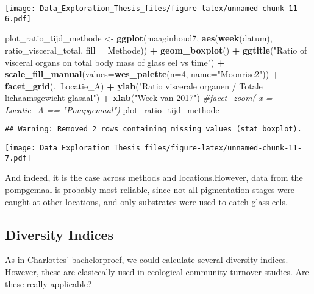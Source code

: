 \documentclass[]{article}
\newenvironment{Shaded}{\begin{snugshade}}{\end{snugshade}}
\newcommand{\KeywordTok}[1]{\textcolor[rgb]{0.13,0.29,0.53}{\textbf{#1}}}
\newcommand{\DataTypeTok}[1]{\textcolor[rgb]{0.13,0.29,0.53}{#1}}
\newcommand{\DecValTok}[1]{\textcolor[rgb]{0.00,0.00,0.81}{#1}}
\newcommand{\StringTok}[1]{\textcolor[rgb]{0.31,0.60,0.02}{#1}}
\newcommand{\CommentTok}[1]{\textcolor[rgb]{0.56,0.35,0.01}{\textit{#1}}}
\newcommand{\OperatorTok}[1]{\textcolor[rgb]{0.81,0.36,0.00}{\textbf{#1}}}
\newcommand{\NormalTok}[1]{#1}
\begin{document}
\texttt{[image: Data\_Exploration\_Thesis\_files/figure-latex/unnamed-chunk-11-6.pdf]}

\begin{Shaded}
\begin{Highlighting}[]
\NormalTok{plot_ratio_tijd_methode <-}\StringTok{ }\KeywordTok{ggplot}\NormalTok{(maaginhoud7, }\KeywordTok{aes}\NormalTok{(}\KeywordTok{week}\NormalTok{(datum), ratio_visceral_total, }\DataTypeTok{fill =}\NormalTok{ Methode)) }\OperatorTok{+}
\StringTok{  }\KeywordTok{geom_boxplot}\NormalTok{() }\OperatorTok{+}
\StringTok{  }\KeywordTok{ggtitle}\NormalTok{(}\StringTok{"Ratio of visceral organs on total body mass of glass eel vs time"}\NormalTok{) }\OperatorTok{+}
\StringTok{  }\KeywordTok{scale_fill_manual}\NormalTok{(}\DataTypeTok{values=}\KeywordTok{wes_palette}\NormalTok{(}\DataTypeTok{n=}\DecValTok{4}\NormalTok{, }\DataTypeTok{name=}\StringTok{"Moonrise2"}\NormalTok{)) }\OperatorTok{+}\StringTok{ }
\StringTok{  }\KeywordTok{facet_grid}\NormalTok{(.}\OperatorTok{~}\NormalTok{Locatie_A) }\OperatorTok{+}
\StringTok{  }\KeywordTok{ylab}\NormalTok{(}\StringTok{"Ratio viscerale organen / Totale lichaamsgewicht glasaal"}\NormalTok{) }\OperatorTok{+}
\StringTok{  }\KeywordTok{xlab}\NormalTok{(}\StringTok{"Week van 2017"}\NormalTok{)}
  \CommentTok{#facet_zoom( x = Locatie_A == "Pompgemaal")}
\NormalTok{plot_ratio_tijd_methode}
\end{Highlighting}
\end{Shaded}

\begin{verbatim}
## Warning: Removed 2 rows containing missing values (stat_boxplot).
\end{verbatim}

\texttt{[image: Data\_Exploration\_Thesis\_files/figure-latex/unnamed-chunk-11-7.pdf]}

And indeed, it is the case across methods and locations.However, data
from the pompgemaal is probably most reliable, since not all
pigmentation stages were caught at other locations, and only substrates
were used to catch glass eels.

\subsection{Diversity Indices}\label{diversity-indices}

As in Charlottes' bachelorproef, we could calculate several diversity
indices. However, these are clasiccally used in ecological community
turnover studies. Are these really applicable?
\end{document}
